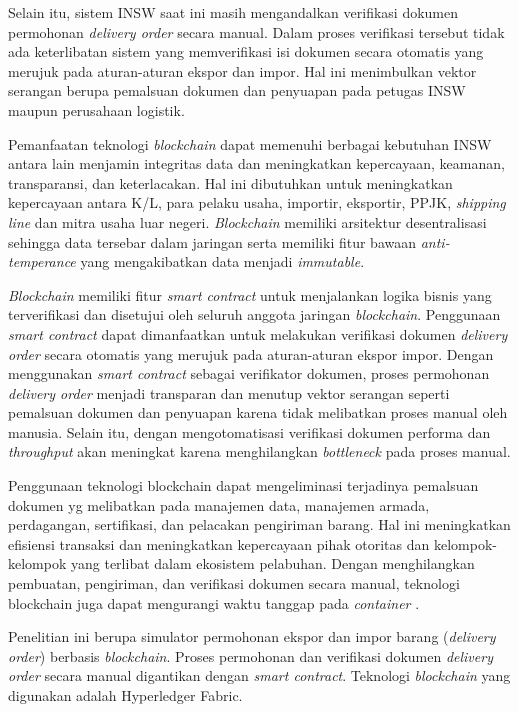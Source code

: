 Selain itu, sistem INSW saat ini masih mengandalkan verifikasi dokumen permohonan \textit{delivery order} secara manual. Dalam proses verifikasi tersebut tidak ada keterlibatan sistem yang memverifikasi isi dokumen secara otomatis yang merujuk pada aturan-aturan ekspor dan impor. Hal ini menimbulkan vektor serangan berupa pemalsuan dokumen dan penyuapan pada petugas INSW maupun perusahaan logistik. 

Pemanfaatan teknologi \textit{blockchain} dapat memenuhi berbagai kebutuhan INSW antara lain menjamin integritas data dan meningkatkan kepercayaan, keamanan, transparansi, dan keterlacakan. Hal ini dibutuhkan untuk meningkatkan kepercayaan antara K/L, para pelaku usaha, importir, eksportir, PPJK, \textit{shipping line} dan mitra usaha luar negeri. \textit{Blockchain} memiliki arsitektur desentralisasi sehingga data tersebar dalam jaringan serta memiliki fitur bawaan \textit{anti-temperance} yang mengakibatkan data menjadi \textit{immutable}. 

\textit{Blockchain} memiliki fitur \textit{smart contract} untuk menjalankan logika bisnis yang terverifikasi dan disetujui oleh seluruh anggota jaringan \textit{blockchain}. Penggunaan \textit{smart contract} dapat dimanfaatkan untuk melakukan verifikasi dokumen \textit{delivery order} secara otomatis yang merujuk pada aturan-aturan ekspor impor. Dengan menggunakan \textit{smart contract} sebagai verifikator dokumen, proses permohonan \textit{delivery order} menjadi transparan dan menutup vektor serangan seperti pemalsuan dokumen dan penyuapan karena tidak melibatkan proses manual oleh manusia. Selain itu, dengan mengotomatisasi verifikasi dokumen performa dan \textit{throughput} akan meningkat karena menghilangkan \textit{bottleneck} pada proses manual.

Penggunaan teknologi blockchain dapat mengeliminasi terjadinya pemalsuan dokumen yg melibatkan pada manajemen data, manajemen armada, perdagangan, sertifikasi, dan pelacakan pengiriman barang. Hal ini meningkatkan efisiensi transaksi dan meningkatkan kepercayaan pihak otoritas dan kelompok-kelompok yang terlibat dalam ekosistem pelabuhan. Dengan menghilangkan pembuatan, pengiriman, dan verifikasi dokumen secara manual, teknologi blockchain juga dapat mengurangi waktu tanggap pada \textit{container} \citep{Ahmad2021}.

Penelitian ini berupa simulator permohonan ekspor dan impor barang (\textit{delivery order}) berbasis \textit{blockchain}. Proses permohonan dan verifikasi dokumen \textit{delivery order} secara manual digantikan dengan \textit{smart contract}. Teknologi \textit{blockchain} yang digunakan adalah Hyperledger Fabric. 

